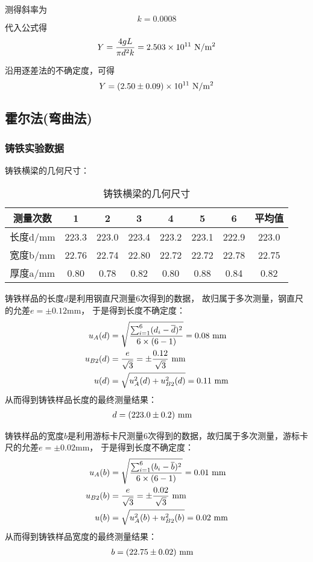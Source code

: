 \documentclass[11pt]{article}
\begin{document}
	测得斜率为
	\[k=0.0008\]
	代入公式得
	\[Y= \frac{4gL}{\pi d^2k}=2.503\times10^{11}\,\,{\rm N/m^2}\]
	
	沿用逐差法的不确定度，可得
	\[Y=(2.50 \pm 0.09)\times10^{11}\,\,{\rm N/m^2}\]
	
	
	\subsection{霍尔法(弯曲法)}
	
	\subsubsection{铸铁实验数据}
	铸铁横梁的几何尺寸：
	\begin{table}[H]
		\centering
		\caption{铸铁横梁的几何尺寸}
		\begin{tabular}{cccccccc}
			\toprule
			测量次数 & 1 & 2 & 3 & 4 & 5 & 6 & 平均值 \\ 
			\midrule
			长度d/mm & 223.3 & 223.0 & 223.4 & 223.2 & 223.1 & 222.9 &223.0\\ 
			宽度b/mm & 22.76 & 22.74 & 22.80 & 22.72 & 22.72 & 22.78 &22.75 \\ 
			厚度a/mm & 0.80 & 0.78 & 0.82 & 0.80 & 0.88 & 0.84 & 0.82 \\ 
			\bottomrule
		\end{tabular}
	\end{table}
	
	铸铁样品的长度$d$是利用钢直尺测量6次得到的数据，
	故归属于多次测量，钢直尺的允差$e=\pm 0.12$mm，
	于是得到长度不确定度：
	\begin{align*}
		u_A(d)&=\sqrt{\frac{\sum_{i=1}^6(d_i-\overline d)^2}{6\times(6-1)}}=0.08\,\,{\rm mm}\\
		u_{B2}(d)&=\frac{e}{\sqrt 3}=\pm \frac{0.12}{\sqrt 3} \,\,{\rm mm}\\
		u(d)&=
		\sqrt{u_{A}^2(d)+u^2_{B2}(d)} 
		=0.11 \,\,{\rm mm}
	\end{align*}
	从而得到铸铁样品长度的最终测量结果：
	\begin{align*}
		d&=(223.0\pm 0.2)\,\, {\rm mm} 
	\end{align*}
	
	
	铸铁样品的宽度$b$是利用游标卡尺测量6次得到的数据，故归属于多次测量，游标卡尺的允差$e=\pm 0.02$mm，
	于是得到长度不确定度：
	\begin{align*}
		u_A(b)&=\sqrt{\frac{\sum_{i=1}^6(b_i-\overline b)^2}{6\times(6-1)}}=0.01\,\,{\rm mm}\\
		u_{B2}(b)&=\frac{e}{\sqrt 3}=\pm \frac{0.02}{\sqrt 3} \,\,{\rm mm}\\
		u(b) &=
		\sqrt{u_{A}^2(b)+u^2_{B2}(b)} 
		=0.02 \,\,{\rm mm}
	\end{align*}
	从而得到铸铁样品宽度的最终测量结果：
	\begin{align*}
		b&=(22.75\pm 0.02)\,\, {\rm mm} 
	\end{align*}
	
\end{document}
